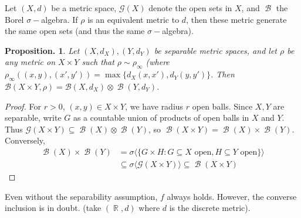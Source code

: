\documentclass[11pt, a4paper]{memoir}
\DeclareMathOperator{\R}{{\mathbb{R}}}
\theoremstyle{change}
\newtheorem{proposition}[theorem]{Proposition.}
\theoremstyle{plain}
\theoremstyle{nonumberplain}
\newtheorem{proof}{Proof}
\DeclareMathOperator{\B}{{\mathcal{B}}}
\numberwithin{equation}{section}
\begin{document}
Let $(X,d)$ be a metric space, $\mathcal{G}(X)$ denote the open sets in $X$, and $\B$ the Borel $\sigma-$algebra.
If $\rho$ is an equivalent metric to $d$, then these metric generate the same open sets (and thus the same $\sigma-$algebra).
\begin{proposition}
    Let $(X,d_X),(Y,d_Y)$ be separable metric spaces, and let $\rho$ be any metric on $X\times Y$ such that $\rho\sim\rho_{\infty}$ (where $\rho_\infty((x,y),(x',y'))=\max\{d_X(x,x'),d_Y(y,y')\}$.
    Then $\mathcal{B}(X\times Y,\rho)=\mathcal{B}(X,d_X)\otimes\B(Y,d_Y)$.
\end{proposition}
\begin{proof}
    For $r>0$, $(x,y)\in X\times Y$, we have radius $r$ open balls.
    Since $X,Y$ are separable, write $G$ as a countable union of products of open balls in $X$ and $Y$.
    Thus $\mathcal{G}(X\times Y)\subseteq\B(X)\otimes\B(Y)$, so $\B(X\times Y)=\B(X)\times\B(Y)$.
    Conversely,
    \begin{align*}
        \B(X)\times\B(Y)&=\sigma\langle\{G\times H:G\subseteq X\text{ open},H\subseteq Y\text{ open}\}\rangle\\
                        &\subseteq\sigma\langle\mathcal{G}(X\times Y)\rangle\subseteq\B(X\times Y)
    \end{align*}
\end{proof}
Even without the separability assumption, $f$ always holds.
However, the converse inclusion is in doubt. (take $(\R,d)$ where $d$ is the discrete metric).
\end{document}
